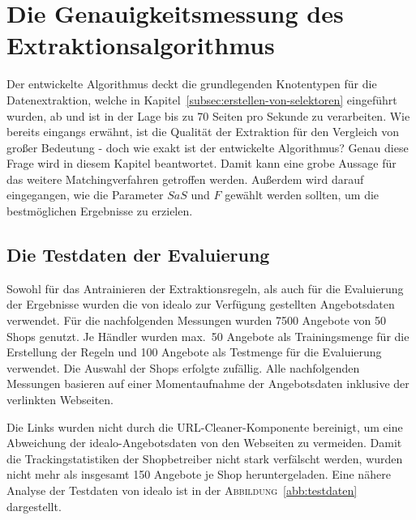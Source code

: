 \section{Die Genauigkeitsmessung des Extraktionsalgorithmus}
\label{sec:evaluierung}

Der entwickelte Algorithmus deckt die grundlegenden Knotentypen für die Datenextraktion, welche in
Kapitel~\ref{subsec:erstellen-von-selektoren} eingeführt wurden, ab und ist in der Lage bis zu 70 Seiten pro Sekunde
zu verarbeiten.
Wie bereits eingangs erwähnt, ist die Qualität der Extraktion für den Vergleich von großer Bedeutung - doch wie
exakt ist der entwickelte Algorithmus?
Genau diese Frage wird in diesem Kapitel beantwortet.
Damit kann eine grobe Aussage für das weitere Matchingverfahren getroffen werden.
Außerdem wird darauf eingegangen, wie die Parameter $SaS$ und $F$ gewählt werden sollten, um die bestmöglichen
Ergebnisse zu erzielen.

\subsection{Die Testdaten der Evaluierung}
\label{subsec:testdaten}
Sowohl für das Antrainieren der Extraktionsregeln, als auch für die Evaluierung der Ergebnisse wurden die von idealo
zur Verfügung gestellten Angebotsdaten verwendet.
Für die nachfolgenden Messungen wurden 7500 Angebote von 50 Shops genutzt.
Je Händler wurden max.\ 50 Angebote als Trainingsmenge für die Erstellung der Regeln und 100 Angebote als Testmenge für
die Evaluierung verwendet.
Die Auswahl der Shops erfolgte zufällig.
Alle nachfolgenden Messungen basieren auf einer Momentaufnahme der Angebotsdaten inklusive der verlinkten Webseiten.

Die Links wurden nicht durch die URL-Cleaner-Kom\-po\-nen\-te bereinigt, um eine Abweichung der idealo-Angebotsdaten von
den Webseiten zu vermeiden.
Damit die Trackingstatistiken der Shopbetreiber nicht stark verfälscht werden, wurden nicht mehr als insgesamt 150
Angebote je Shop heruntergeladen.
Eine nähere Analyse der Testdaten von idealo ist in der \textsc{Abbildung}~\ref{abb:testdaten} dargestellt.

